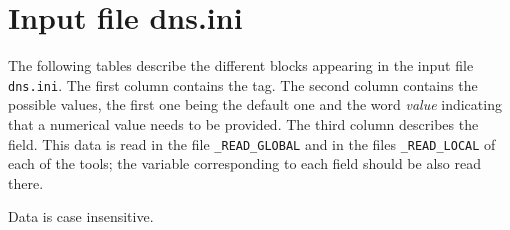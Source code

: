 \section{Input file dns.ini}

The following tables describe the different blocks appearing in the input file {\tt dns.ini}. The first column contains the tag. The second column contains the possible values, the first one being the default one and the word {\it value} indicating that a numerical value needs to be provided. The third column describes the field. This data is read in the file {\tt *\_READ\_GLOBAL} and in the files {\tt *\_READ\_LOCAL} of each of the tools; the variable corresponding to each field should be also read there.

Data is case insensitive.

